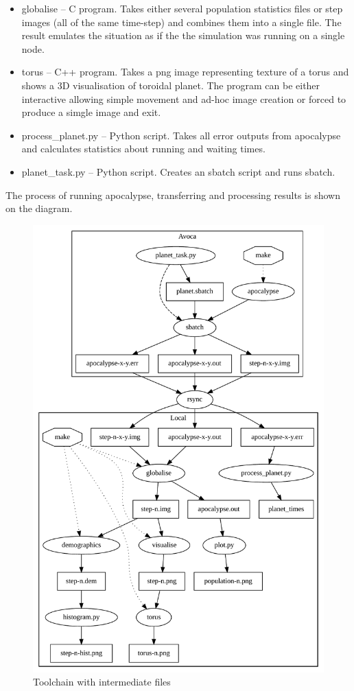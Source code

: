 \documentclass[a4paper]{article}
\begin{document}
\begin{itemize}
\item globalise -- C program. Takes either several population statistics files or step images (all of the same time-step) and combines them into a single file.
    The result emulates the situation as if the the simulation was running on a single node.
\item torus -- C++ program. Takes a png image representing texture of a torus and shows a 3D visualisation of toroidal planet.
    The program can be either interactive allowing simple movement and ad-hoc image creation or forced to produce a simgle image and exit.
\item process\_planet.py -- Python script. Takes all error outputs from apocalypse and calculates statistics about running and waiting times.
\item planet\_task.py -- Python script. Creates an sbatch script and runs sbatch. 
\end{itemize}

The process of running apocalypse, transferring and processing results is shown on the diagram.

\begin{figure}[pht]
    \centering
    \includegraphics[width=\textwidth]{toolchain}
    \caption{Toolchain with intermediate files}
\end{figure}
\end{document}
